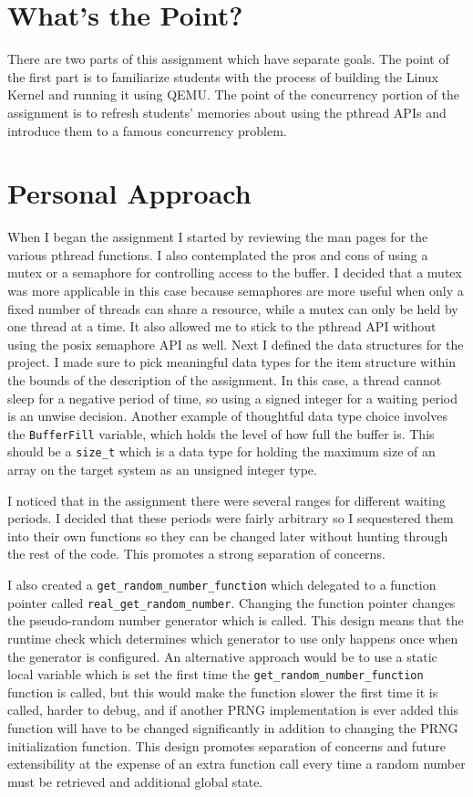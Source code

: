 \documentclass[10pt,conference,draftclsnofoot,onecolumn]{IEEEtran}
\begin{document}
\section{What's the Point?}
There are two parts of this assignment which have separate goals. The point of the first part is to familiarize students with the process of building the Linux Kernel and running it using QEMU. The point of the concurrency portion of the assignment is to refresh students' memories about using the pthread APIs and introduce them to a famous concurrency problem.

\section{Personal Approach}
When I began the assignment I started by reviewing the man pages for the various pthread functions. I also contemplated the pros and cons of using a mutex or a semaphore for controlling access to the buffer. I decided that a mutex was more applicable in this case because semaphores are more useful when only a fixed number of threads can share a resource, while a mutex can only be held by one thread at a time. It also allowed me to stick to the pthread API without using the posix semaphore API as well. Next I defined the data structures for the project. I made sure to pick meaningful data types for the item structure within the bounds of the description of the assignment. In this case, a thread cannot sleep for a negative period of time, so using a signed integer for a waiting period is an unwise decision. Another example of thoughtful data type choice involves the \texttt{BufferFill} variable, which holds the level of how full the buffer is. This should be a \texttt{size\_t} which is a data type for holding the maximum size of an array on the target system as an unsigned integer type.

I noticed that in the assignment there were several ranges for different waiting periods. I decided that these periods were fairly arbitrary so I sequestered them into their own functions so they can be changed later without hunting through the rest of the code. This promotes a strong separation of concerns.

I also created a \texttt{get\_random\_number\_function} which delegated to a function pointer called \texttt{real\_get\_random\_number}. Changing the function pointer changes the pseudo-random number generator which is called. This design means that the runtime check which determines which generator to use only happens once when the generator is configured. An alternative approach would be to use a static local variable which is set the first time the \texttt{get\_random\_number\_function} function is called, but this would make the function slower the first time it is called, harder to debug, and if another PRNG implementation is ever added this function will have to be changed significantly in addition to changing the PRNG initialization function. This design promotes separation of concerns and future extensibility at the expense of an extra function call every time a random number must be retrieved and additional global state.
\end{document}

